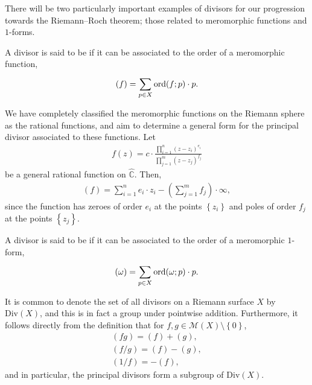 There will be two particularly important examples of divisors for our
progression towards the Riemann--Roch theorem; those related to meromorphic
functions and $ 1 $-forms.

\begin{definition}
	A divisor is said to be  if it can be associated to the
	order of a meromorphic function,
	\begin{align*}
		(f) = \sum_{p \in X}^{}{\operatorname{ord}(f;p)\cdot p}.
	\end{align*}
\end{definition}

\begin{example}
	We have completely classified the meromorphic functions on the Riemann sphere
	as the rational functions, and aim to determine a general form for the
	principal divisor associated to these functions. Let
	\begin{align*}
		f(z) = c \cdot
		\frac{\prod_{i=1}^{n}{(z-z_i)^{e_i}}}{\prod_{j=1}^{m}{(z-z_j)^{f_j}}}
	\end{align*}
	be a general rational function on $ \hat{\mathbb{C}} $. Then,
	\begin{align*}
		\left( f \right) = \sum_{i=1}^{n}{e_i \cdot z_i} - \left(
		\sum_{j=1}^{m}{f_j} \right)\cdot \infty,
	\end{align*}
	since the function has zeroes of order $ e_i $ at the points $ \left\{ z_i
		\right\} $ and poles of order $ f_j $ at the points $ \left\{ z_j \right\} $.
\end{example}

\begin{definition}
	A divisor is said to be  if it can be associated to the
	order of a meromorphic $ 1 $-form,
	\begin{align*}
		(\omega) = \sum_{p \in X}^{}{\operatorname{ord}(\omega;p)\cdot p}.
	\end{align*}
\end{definition}

\begin{remark}
	It is common to denote the set of all divisors on a Riemann surface $ X $ by
	$ \mathrm{Div}(X) $, and this is in fact a group under pointwise addition.
	Furthermore, it follows directly from the definition that for $ f,g \in
		\mathcal{M}(X)\setminus \left\{ 0 \right\} $,
	\begin{gather*}
		(f g) = (f) + (g), \\
		(f/g) = (f) - (g), \\
		(1/f) = -(f),
	\end{gather*}
	and in particular, the principal divisors form a subgroup of $ \mathrm{Div}(X)
	$.
\end{remark}

